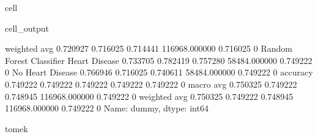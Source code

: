 \documentclass[letterpaper,10pt,english]{jupyterBook}
\begin{document}
\begin{sphinxuseclass}{cell}
\begin{sphinxVerbatimOutput}
\begin{sphinxuseclass}{cell_output}
\begin{sphinxVerbatim}[commandchars=\\\{\}]
                           weighted avg      0.720927   0.716025  0.714441  116968.000000  0.716025    0
Random Forest Classifier   Heart Disease     0.733705   0.782419  0.757280  58484.000000   0.749222    0
                           No Heart Disease  0.766946   0.716025  0.740611  58484.000000   0.749222    0
                           accuracy          0.749222   0.749222  0.749222  0.749222       0.749222    0
                           macro avg         0.750325   0.749222  0.748945  116968.000000  0.749222    0
                           weighted avg      0.750325   0.749222  0.748945  116968.000000  0.749222    0
Name: dummy, dtype: int64

tomek
\PYGZhy{}\PYGZhy{}\PYGZhy{}\PYGZhy{}\PYGZhy{}\PYGZhy{}\PYGZhy{}\PYGZhy{}\PYGZhy{}\PYGZhy{}\PYGZhy{}\PYGZhy{}\PYGZhy{}\PYGZhy{}\PYGZhy{}\PYGZhy{}\PYGZhy{}\PYGZhy{}\PYGZhy{}
\end{sphinxVerbatim}

\noindent{}


\end{sphinxuseclass}
\end{sphinxVerbatimOutput}
\end{sphinxuseclass}
\end{document}
